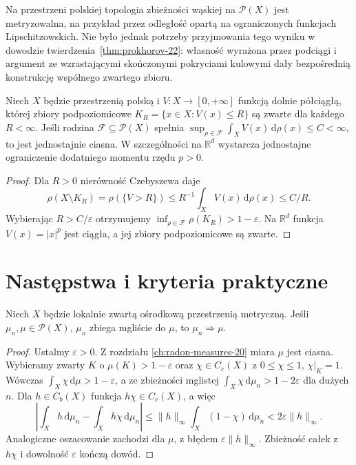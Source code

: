\begin{uwaga}
Na przestrzeni polskiej topologia zbieżności wąskiej
na $\mathcal P(X)$ jest metryzowalna, na przykład przez
odległość opartą na ograniczonych funkcjach Lipschitzowskich.
Nie było jednak potrzeby przyjmowania tego wyniku
w dowodzie twierdzenia~\ref{thm:prokhorov-22}:
własność wyrażona przez podciągi i argument ze
wzrastającymi skończonymi pokryciami kulowymi
dały bezpośrednią konstrukcję wspólnego zwartego zbioru.
\end{uwaga}

\begin{wniosek}
\label{cor:coercive-tight-22}
Niech $X$ będzie przestrzenią polską i
$V:X\to[0,+\infty]$ funkcją dolnie półciągłą,
której zbiory podpoziomicowe
$K_R=\{x\in X:V(x)\le R\}$ są zwarte dla każdego
$R<\infty$. Jeśli rodzina $\mathcal F\subseteq\mathcal P(X)$
spełnia
$\sup_{\rho\in\mathcal F}\int_X V(x)\,\mathrm d\rho(x)
\le C<\infty$, to jest jednostajnie ciasna.
W szczególności na $\mathbb R^d$ wystarcza jednostajne
ograniczenie dodatniego momentu rzędu $p>0$.
\end{wniosek}
\begin{proof}
Dla $R>0$ nierówność Czebyszewa daje
\[
 \rho(X\setminus K_R)=\rho(\{V>R\})
 \le R^{-1}\int_X V(x)\,\mathrm d\rho(x)\le C/R.
\]
Wybierając $R>C/\varepsilon$ otrzymujemy
$\inf_{\rho\in\mathcal F}\rho(K_R)>1-\varepsilon$.
Na $\mathbb R^d$ funkcja $V(x)=|x|^p$ jest ciągła,
a jej zbiory podpoziomicowe są zwarte.
\end{proof}

\section{Następstwa i kryteria praktyczne}
\begin{wniosek}
\label{cor:vague-narrow-22}
Niech $X$ będzie lokalnie zwartą ośrodkową
przestrzenią metryczną. Jeśli $\mu_n,\mu\in\mathcal P(X)$,
$\mu_n$ zbiega mgliście do $\mu$, to
$\mu_n\Rightarrow\mu$.
\end{wniosek}
\begin{proof}
Ustalmy $\varepsilon>0$. Z rozdziału
\ref{ch:radon-measures-20} miara $\mu$ jest ciasna.
Wybieramy zwarty $K$ o $\mu(K)>1-\varepsilon$
oraz $\chi\in C_c(X)$ z $0\le\chi\le1$,
$\chi|_K=1$. Wówczas
$\int_X\chi\,\mathrm d\mu>1-\varepsilon$,
a ze zbieżności mglistej
$\int_X\chi\,\mathrm d\mu_n>1-2\varepsilon$
dla dużych $n$. Dla $h\in C_b(X)$
funkcja $h\chi\in C_c(X)$, a więc
\[
\left|\int_Xh\,\mathrm d\mu_n-
\int_Xh\chi\,\mathrm d\mu_n\right|
\le\|h\|_\infty\int_X(1-\chi)\,\mathrm d\mu_n
<2\varepsilon\|h\|_\infty.
\]
Analogiczne oszacowanie zachodzi dla $\mu$,
z błędem $\varepsilon\|h\|_\infty$.
Zbieżność całek z $h\chi$ i dowolność $\varepsilon$
kończą dowód.
\end{proof}

